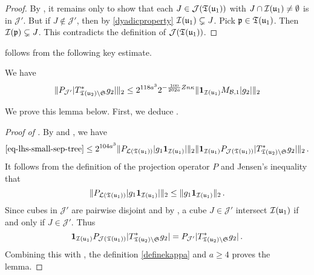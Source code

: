     \begin{proof}
        By , it remains only to show that each $J \in \mathcal{J}({\mathfrak T}({\mathfrak u}_1))$ with $J \cap {\mathcal{I}}({\mathfrak u}_1) \ne \emptyset$ is in $\mathcal{J}'$. But if $J \notin \mathcal{J}'$, then by \eqref{dyadicproperty} ${\mathcal{I}}({\mathfrak u}_1) \subsetneq J$. Pick ${\mathfrak p} \in {\mathfrak T}({\mathfrak u}_1)$. Then ${\mathcal{I}}({\mathfrak p}) \subsetneq J$. This contradicts the definition of $\mathcal{J}({\mathfrak T}({\mathfrak u}_1))$.
    \end{proof}

     follows from the following key estimate.

    \begin{lemma}
        \label{bound-for-tree-projection}
        \leanok
        We have
        $$
            \|P_{\mathcal{J}'}|T_{{\mathfrak T}({\mathfrak u}_2) \setminus \mathfrak{S}}^* g_2|\|_2
            \le 2^{118a^3} 2^{-\frac{100}{202a}Zn\kappa} \|\mathbf{1}_{{\mathcal{I}}({\mathfrak u}_1)} M_{\mathcal{B},1} |g_2|\|_2
        $$
    \end{lemma}

    We prove this lemma below. First, we deduce .

    \begin{proof}[Proof of ]
        By  and , we have
        \begin{align*}
            \eqref{eq-lhs-small-sep-tree} \le 2^{104a^3} \|P_{\mathcal{L}({\mathfrak T}({\mathfrak u}_1))} |g_1\mathbf{1}_{{\mathcal{I}}({\mathfrak u}_1)}| \|_2 \|\mathbf{1}_{{\mathcal{I}}({\mathfrak u}_1)} P_{\mathcal{J}({\mathfrak T}({\mathfrak u}_1) )}|T_{{\mathfrak T}({\mathfrak u}_2) \setminus \mathfrak{S}}^* g_2|\|_2\,.
        \end{align*}
        It follows from the definition of the projection operator $P$ and Jensen's inequality that
        $$
            \|P_{\mathcal{L}({\mathfrak T}({\mathfrak u}_1))} |g_1\mathbf{1}_{{\mathcal{I}}({\mathfrak u}_1)}| \|_2 \le \|g_1 \mathbf{1}_{{\mathcal{I}}({\mathfrak u}_1)}\|_2\,.
        $$
        Since cubes in $\mathcal{J}'$ are pairwise disjoint and by , a cube $J \in \mathcal{J}'$ intersect ${\mathcal{I}}({\mathfrak u}_1)$ if and only if $J \in \mathcal{J}'$. Thus
        $$
            \mathbf{1}_{{\mathcal{I}}({\mathfrak u}_1)} P_{\mathcal{J}({\mathfrak T}({\mathfrak u}_1) )}|T_{{\mathfrak T}({\mathfrak u}_2) \setminus \mathfrak{S}}^* g_2| = P_{\mathcal{J}'}|T_{{\mathfrak T}({\mathfrak u}_2) \setminus \mathfrak{S}}^* g_2|\,.
        $$
        Combining this with , the definition \eqref{definekappa} and $a \ge 4$ proves the lemma.
    \end{proof}


